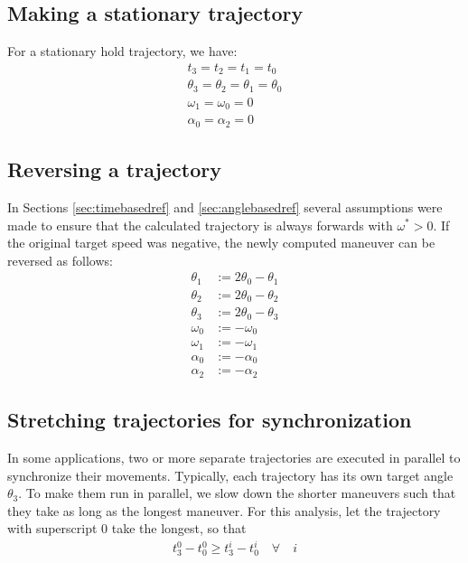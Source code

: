 \documentclass[12pt, a4paper]
{article}
\providecommand{\w}{\omega}
\providecommand{\wt}{\w^*}
\renewcommand{\th}{\theta}
\renewcommand{\a}{\alpha}
\providecommand{\w}{\omega}
\begin{document}
\subsection{Making a stationary trajectory}
\label{sec:stationary}
For a stationary hold trajectory, we have:
%
\begin{align}
    t_3 = t_2 = t_1 = t_0 \\[1em]
    \th_3 = \th_2 = \th_1 = \th_0 \\[1em]
    \w_1 = \w_0 = 0 \\[1em]
    \a_0 = \a_2 = 0
\end{align}


\subsection{Reversing a trajectory}
\label{sec:invert}
In Sections \ref{sec:timebasedref} and \ref{sec:anglebasedref} several
assumptions were made to ensure that the calculated trajectory is always
forwards with $\wt > 0$. If the original target speed was negative, the
newly computed maneuver can be reversed as follows:
%
\begin{align}
    \th_1 &:= 2 \th_0 - \th_1\\[1em]
    \th_2 &:= 2 \th_0 - \th_2\\[1em]
    \th_3 &:= 2 \th_0 - \th_3\\[1em]
    \w_0 &:= -\w_0\\[1em]
    \w_1 &:= -\w_1\\[1em]
    \a_0 &:= -\a_0\\[1em]
    \a_2 &:= -\a_2
\end{align}

\subsection{Stretching trajectories for synchronization}

In some applications, two or more separate trajectories are executed in
parallel to synchronize their movements. Typically, each trajectory has its own
target angle $\th_3$. To make them run in parallel, we slow down the shorter
maneuvers such that they take as long as the longest maneuver. For this
analysis, let the trajectory with superscript $0$ take the longest, so that
%
\begin{align}
    t^0_3 - t^0_0 \geq t^i_3 - t^i_0  \quad \forall \quad i
\end{align}
\end{document}
